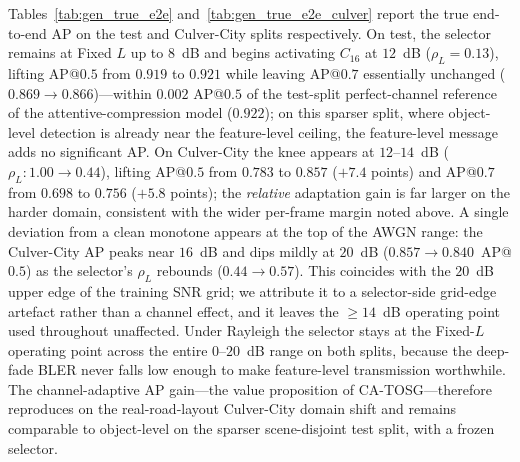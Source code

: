 \documentclass[journal]{IEEEtran}
\newcommand{\method}{CA-TOSG}
\begin{document}
Tables~\ref{tab:gen_true_e2e} and~\ref{tab:gen_true_e2e_culver} report the true end-to-end AP on the test and Culver-City splits respectively. On test, the selector remains at Fixed $L$ up to $8$~dB and begins activating $C_{16}$ at $12$~dB ($\rho_L=0.13$), lifting AP@$0.5$ from $0.919$ to $0.921$ while leaving AP@$0.7$ essentially unchanged ($0.869\!\to\!0.866$)---within $0.002$ AP@$0.5$ of the test-split perfect-channel reference of the attentive-compression model ($0.922$); on this sparser split, where object-level detection is already near the feature-level ceiling, the feature-level message adds no significant AP. On Culver-City the knee appears at $12$--$14$~dB ($\rho_L: 1.00 \to 0.44$), lifting AP@$0.5$ from $0.783$ to $0.857$ ($+7.4$ points) and AP@$0.7$ from $0.698$ to $0.756$ ($+5.8$ points); the \emph{relative} adaptation gain is far larger on the harder domain, consistent with the wider per-frame margin noted above. A single deviation from a clean monotone appears at the top of the AWGN range: the Culver-City AP peaks near $16$~dB and dips mildly at $20$~dB ($0.857\!\to\!0.840$~AP@$0.5$) as the selector's $\rho_L$ rebounds ($0.44\!\to\!0.57$). This coincides with the $20$~dB upper edge of the training SNR grid; we attribute it to a selector-side grid-edge artefact rather than a channel effect, and it leaves the $\ge14$~dB operating point used throughout unaffected. Under Rayleigh the selector stays at the Fixed-$L$ operating point across the entire $0$--$20$~dB range on both splits, because the deep-fade BLER never falls low enough to make feature-level transmission worthwhile. The channel-adaptive AP gain---the value proposition of \method{}---therefore reproduces on the real-road-layout Culver-City domain shift and remains comparable to object-level on the sparser scene-disjoint test split, with a frozen selector.
\end{document}
